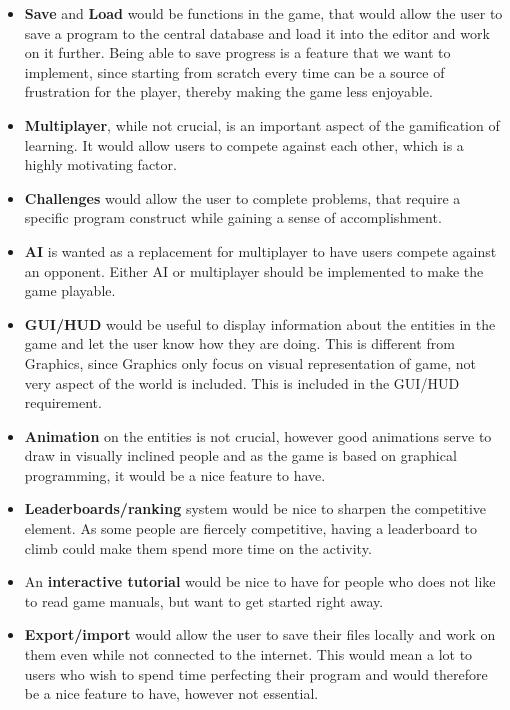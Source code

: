 \begin{itemize}
	\item \textbf{Save} and \textbf{Load} would be functions in the game, that would allow the user to save a program to the central database and load it into the editor and work on it further.
	Being able to save progress is a feature that we want to implement, since starting from scratch every time can be a source of frustration for the player, thereby making the game less enjoyable.
	\item \textbf{Multiplayer}, while not crucial, is an important aspect of the gamification of learning.
	It would allow users to compete against each other, which is a highly motivating factor.
	\item \textbf{Challenges} would allow the user to complete problems, that require a specific program construct while gaining a sense of accomplishment.
	\item \textbf{AI} is wanted as a replacement for multiplayer to have users compete against an opponent.
	Either AI or multiplayer should be implemented to make the game playable.
	\item \textbf{GUI/HUD} would be useful to display information about the entities in the game and let the user know how they are doing.
	This is different from Graphics, since Graphics only focus on visual representation of game, not very aspect of the world is included.
	This is included in the GUI/HUD 
requirement.
\end{itemize}

\begin{itemize}
	\item \textbf{Animation} on the entities is not crucial, however good animations serve to draw in visually inclined people and as the game is based on graphical programming, it would be a nice feature to have.
	\item \textbf{Leaderboards/ranking} system would be nice to sharpen the competitive element.
	As some people are fiercely competitive, having a leaderboard to climb could make them spend more time on the activity.
	\item An \textbf{interactive tutorial} would be nice to have for people who does not like to read game manuals, but want to get started right away.
	\item \textbf{Export/import} would allow the user to save their files locally and work on them even while not connected to the internet.
	This would mean a lot to users who wish to spend time perfecting their program and would therefore be a nice feature to have, however not essential.
\end{itemize}